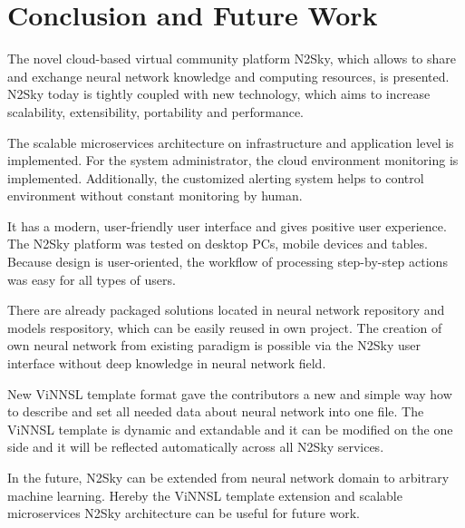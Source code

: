 \newpage

\section{Conclusion and Future Work}\label{Conclusion and Future Work}

The novel cloud-based virtual community platform N2Sky, which allows to share and exchange neural network knowledge and computing resources, is presented. N2Sky today is tightly coupled with new technology, which aims to increase scalability, extensibility, portability and performance.

The scalable microservices architecture on infrastructure and application level is implemented. For the system administrator, the cloud environment monitoring is implemented. Additionally, the customized alerting system helps to control environment without constant monitoring by human.  

It has a modern, user-friendly user interface and gives positive user experience. The N2Sky platform was tested on desktop PCs, mobile devices and tables. Because design is user-oriented, the workflow of processing step-by-step actions was easy for all types of users. 

There are already packaged solutions located in neural network repository and models respository, which can be easily reused in own project. The creation of own neural network from existing paradigm is possible via the N2Sky user interface without deep knowledge in neural network field.

New ViNNSL template format gave the contributors a new and simple way how to describe and set all needed data about neural network into one file. The ViNNSL template is dynamic and extandable and it can be modified on the one side and it will be reflected automatically across all N2Sky services. 

In the future, N2Sky can be extended from neural network domain to arbitrary machine learning. Hereby the ViNNSL template extension and scalable microservices N2Sky architecture can be useful for future work.